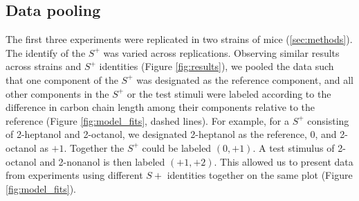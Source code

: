 \subsection{Data pooling}
\label{results_pooling}
The first three experiments were replicated in two strains of mice (\ref{sec:methods}). 
The identify of the $S^+$ was varied across replications.  
Observing similar results across strains and $S^+$ identities (Figure \ref{fig:results}), we pooled the data such that one component of the $S^+$ was designated as the reference component, and all other components in the $S^+$ or the test stimuli were labeled according to the difference in carbon chain length among their components relative to the reference (Figure \ref{fig:model_fits}, dashed lines).  
For example, for a $S^+$ consisting of 2-heptanol and 2-octanol, we designated 2-heptanol as the reference, $0$, and 2-octanol as $+1$.  
Together the $S^+$ could be labeled $(0,+1)$.  
A test stimulus of 2-octanol and 2-nonanol is then labeled $(+1,+2)$.  
This allowed us to present data from experiments using different $S+$ identities together on the same plot (Figure \ref{fig:model_fits}).  